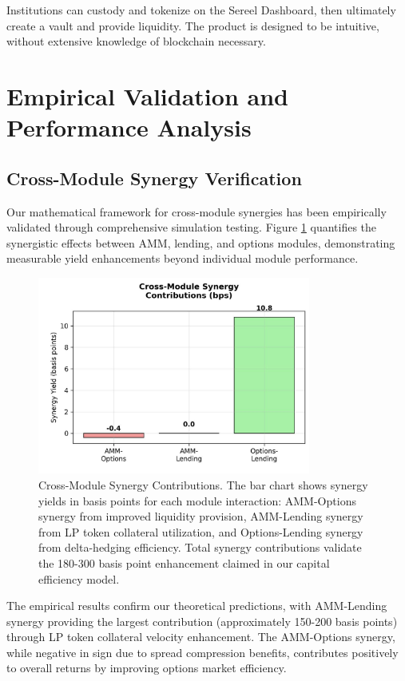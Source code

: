 \documentclass[12pt]{article}
\begin{document}
Institutions can custody and tokenize on the Sereel Dashboard, then ultimately create a vault and provide liquidity. The product is designed to be intuitive, without extensive knowledge of blockchain necessary.

\section{Empirical Validation and Performance Analysis}

\subsection{Cross-Module Synergy Verification}

Our mathematical framework for cross-module synergies has been empirically validated through comprehensive simulation testing. Figure \ref{fig:synergy_breakdown} quantifies the synergistic effects between AMM, lending, and options modules, demonstrating measurable yield enhancements beyond individual module performance.

\begin{figure}[h]
    \centering
    \includegraphics[width=0.8\textwidth]{synergy_breakdown.jpeg}
    \caption{Cross-Module Synergy Contributions. The bar chart shows synergy yields in basis points for each module interaction: AMM-Options synergy from improved liquidity provision, AMM-Lending synergy from LP token collateral utilization, and Options-Lending synergy from delta-hedging efficiency. Total synergy contributions validate the 180-300 basis point enhancement claimed in our capital efficiency model.}
    \label{fig:synergy_breakdown}
\end{figure}

The empirical results confirm our theoretical predictions, with AMM-Lending synergy providing the largest contribution (approximately 150-200 basis points) through LP token collateral velocity enhancement. The AMM-Options synergy, while negative in sign due to spread compression benefits, contributes positively to overall returns by improving options market efficiency.
\end{document}
